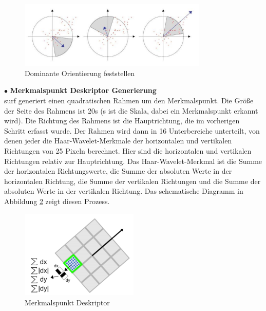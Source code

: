 \begin{figure}[htb]
 \centering 
 \includegraphics[keepaspectratio,width=0.8\textwidth]{images/3_Ersteverfahren/Dominante_Orientierung_Feststellen.pdf}
 \caption{Dominante Orientierung feststellen}
 \label{fig:Dominante Orientierung Feststellen}
\end{figure} 


$\bullet$ \textbf{Merkmalspunkt Deskriptor Generierung}\\
\gls{surf} generiert einen quadratischen Rahmen um den Merkmalspunkt. Die Größe der Seite des Rahmens ist 20\si{s} (s ist die Skala, dabei ein Merkmalspunkt erkannt wird). Die Richtung des Rahmens ist die Hauptrichtung, die im vorherigen Schritt erfasst wurde. Der Rahmen wird dann in 16 Unterbereiche unterteilt, von denen jeder die Haar-Wavelet-Merkmale der horizontalen und vertikalen Richtungen von 25 Pixeln berechnet. Hier sind die horizontalen und vertikalen Richtungen relativ zur Hauptrichtung. Das Haar-Wavelet-Merkmal ist die Summe der horizontalen Richtungswerte, die Summe der absoluten Werte in der horizontalen Richtung, die Summe der vertikalen Richtungen und die Summe der absoluten Werte in der vertikalen Richtung. Das schematische Diagramm in Abbildung \ref{fig:Merkmalspunkt Deskriptor} zeigt diesen Prozess.

\begin{figure}[htb]
 \centering 
 \includegraphics[keepaspectratio,width=0.5\textwidth]{images/3_Ersteverfahren/Merkmalspunkt_Deskriptor.pdf}
 \caption{Merkmalspunkt Deskriptor}
 \label{fig:Merkmalspunkt Deskriptor}
\end{figure} 

